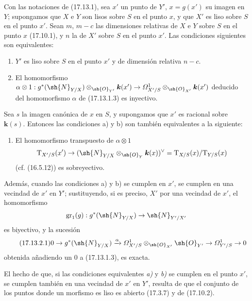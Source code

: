 \begin{proposition}[17.13.2]
\label{IV.17.13.2}
Con las notaciones de \textup{(17.13.1)}, sea $x'$ un punto de $Y'$, $x=g(x')$ su imagen en $Y$; supongamos que $X$ e $Y$ son lisos sobre $S$ en el punto $x$, y que $X'$ es liso sobre $S$ en el punto $x'$. Sean $m$, $m-c$ las dimensiones relativas de $X$ e $Y$ sobre $S$ en el punto $x$ \textup{(17.10.1)}, y $n$ la de $X'$ sobre $S$ en el punto $x'$. Las condiciones siguientes son equivalentes:
\begin{enumerate}
  \item[\textup{a)}] $Y'$ es liso sobre $S$ en el punto $x'$ y de dimensión relativa $n-c$.
  \item[\textup{b)}] El homomorfismo $\alpha\otimes1:g^*(\sh{N}_{Y/X})\otimes_{\sh{O}_{Y'}}\boldsymbol k(x')\to\varOmega^1_{X'/S}\otimes_{\sh{O}_{X'}}\boldsymbol k(x')$ deducido del homomorfismo $\alpha$ de \textup{(17.13.1.3)} es inyectivo.
\end{enumerate}
Sea $s$ la imagen canónica de $x$ en $S$, y supongamos que $x'$ es racional sobre $\boldsymbol k(s)$. Entonces las condiciones \textup{a)} y \textup{b)} son también equivalentes a la siguiente:
\begin{enumerate}
  \item[\textup{b$'$)}] El homomorfismo transpuesto de $\alpha\otimes1$
  \[
  \mathrm{T}_{X'/S}(x')\to(\sh{N}_{Y/X}\otimes_{\sh{O}_Y}\boldsymbol k(x))^\vee=\mathrm{T}_{X/S}(x)/\mathrm{T}_{Y/S}(x)
  \]
  \textup{(cf. (16.5.12))} es sobreyectivo.
\end{enumerate}
Además, cuando las condiciones \textup{a)} y \textup{b)} se cumplen en $x'$, se cumplen en una vecindad de $x'$ en $Y'$; sustituyendo, si es preciso, $X'$ por una vecindad de $x'$, el homomorfismo
\[
\operatorname{gr}_1(g):g^*(\sh{N}_{Y/X})\to\sh{N}_{Y'/X'}
\]
es biyectivo, y la sucesión
\[
\label{IV.17.13.2.1}
\tag{17.13.2.1}
0\to g^*(\sh{N}_{Y/X})\xrightarrow{\alpha}\varOmega^1_{X'/S}\otimes_{\sh{O}_{X'}}\sh{O}_{Y'}\to\varOmega^1_{Y'/S}\to0
\]
obtenida añadiendo un $0$ a \textup{(17.13.1.3)}, es exacta.
\end{proposition}

El hecho de que, si las condiciones equivalentes \emph{a)} y \emph{b)} se cumplen en el punto $x'$, se cumplen también en una vecindad de $x'$ en $Y'$, resulta de que el conjunto de los puntos donde un morfismo es liso es abierto (17.3.7) y de (17.10.2).

